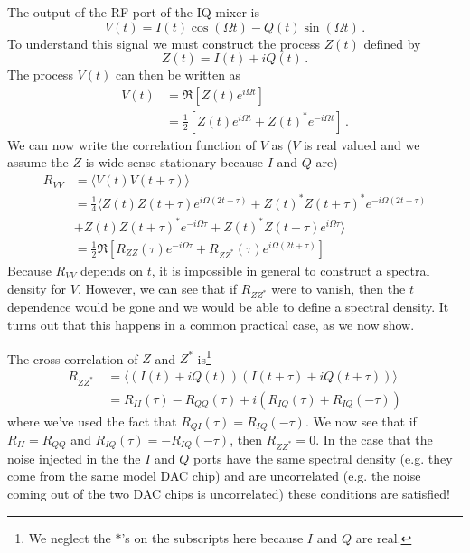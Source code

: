 The output of the RF port of the IQ mixer is
\begin{equation}
V(t) = I(t) \cos(\Omega t) - Q(t) \sin(\Omega t) \, .
\end{equation}
To understand this signal we must construct the process $Z(t)$ defined by
\begin{equation}
Z(t) = I(t) + i Q(t) \, .
\end{equation}
The process $V(t)$ can then be written as
\begin{align}
V(t)
&= \Re \left[ Z(t) e^{i \Omega t} \right] \\
&= \frac{1}{2} \left[ Z(t) e^{i \Omega t} + Z(t)^* e^{-i \Omega t} \right] \, .
\end{align}
We can now write the correlation function of $V$ as ($V$ is real valued and we assume the $Z$ is wide sense stationary because $I$ and $Q$ are)
\begin{align}
R_{VV}
&= \langle V(t) V(t+\tau) \rangle \\
&= \frac{1}{4} \langle
Z(t)Z(t+\tau) e^{i\Omega (2t + \tau)}
+ Z(t)^* Z(t+\tau)^* e^{-i\Omega (2t + \tau)} \\
& + Z(t) Z(t+\tau)^* e^{-i \Omega \tau}
+ Z(t)^* Z(t+\tau) e^{i \Omega \tau}
\rangle \\
&= \frac{1}{2} \Re \left[ R_{ZZ}(\tau) e^{-i \Omega \tau}
+ R_{ZZ^*}(\tau) e^{i \Omega (2t + \tau)} \right]
\end{align}
Because $R_{VV}$ depends on $t$, it is impossible in general to construct a spectral density for $V$.
However, we can see that if $R_{ZZ^*}$ were to vanish, then the $t$ dependence would be gone and we would be able to define a spectral density.
It turns out that this happens in a common practical case, as we now show.

The cross-correlation of $Z$ and $Z^*$ is\footnote{We neglect the $*$'s on the subscripts here because $I$ and $Q$ are real.}
\begin{align}
R_{ZZ^*}\
&= \langle (I(t) + i Q(t))(I(t+\tau) + i Q(t+\tau)) \rangle \\
&= R_{II}(\tau) - R_{QQ}(\tau) + i \left( R_{IQ}(\tau) + R_{IQ}(-\tau) \right)
\end{align}
where we've used the fact that $R_{QI}(\tau) = R_{IQ}(-\tau)$.
We now see that if $R_{II} = R_{QQ}$ and $R_{IQ}(\tau) = - R_{IQ}(-\tau)$, then $R_{ZZ^*} = 0$.
In the case that the noise injected in the the $I$ and $Q$ ports have the same spectral density (e.g. they come from the same model DAC chip) and are uncorrelated (e.g. the noise coming out of the two DAC chips is uncorrelated) these conditions are satisfied!

